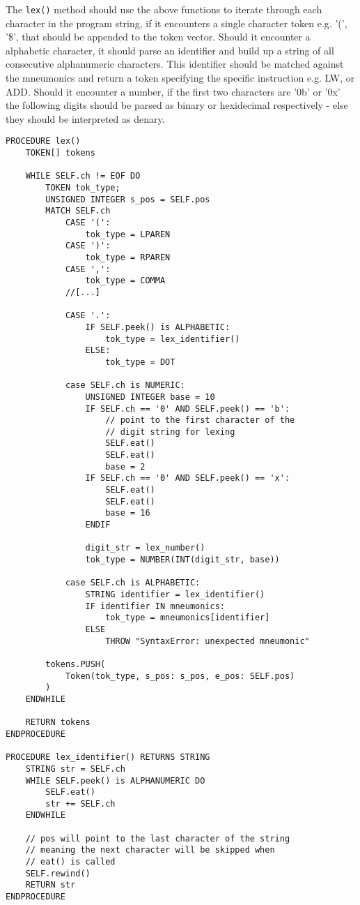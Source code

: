 The \texttt{lex()} method should use the above functions to iterate through each character in the program string, if it encounters a single character token e.g. '(', '\$', that should be appended to the token vector. Should it encounter a alphabetic character, it should parse an identifier and build up a string of all consecutive alphanumeric characters. This identifier should be matched against the mneumonics and return a token specifying the specific instruction e.g. LW, or ADD. Should it encounter a number, if the first two characters are '0b' or '0x' the following digits should be parsed as binary or hexidecimal respectively - else they should be interpreted as denary. 

\begin{lstlisting}
PROCEDURE lex() 
    TOKEN[] tokens

    WHILE SELF.ch != EOF DO 
        TOKEN tok_type;
        UNSIGNED INTEGER s_pos = SELF.pos
        MATCH SELF.ch 
            CASE '(':
                tok_type = LPAREN
            CASE ')':
                tok_type = RPAREN
            CASE ',':
                tok_type = COMMA
            //[...]

            CASE '.':
                IF SELF.peek() is ALPHABETIC:
                    tok_type = lex_identifier()
                ELSE:
                    tok_type = DOT

            case SELF.ch is NUMERIC:
                UNSIGNED INTEGER base = 10
                IF SELF.ch == '0' AND SELF.peek() == 'b':
                    // point to the first character of the
                    // digit string for lexing
                    SELF.eat()
                    SELF.eat()
                    base = 2
                IF SELF.ch == '0' AND SELF.peek() == 'x':
                    SELF.eat()
                    SELF.eat()
                    base = 16
                ENDIF
                
                digit_str = lex_number()
                tok_type = NUMBER(INT(digit_str, base)) 

            case SELF.ch is ALPHABETIC:
                STRING identifier = lex_identifier()
                IF identifier IN mneumonics:
                    tok_type = mneumonics[identifier]
                ELSE 
                    THROW "SyntaxError: unexpected mneumonic"

        tokens.PUSH(
            Token(tok_type, s_pos: s_pos, e_pos: SELF.pos)
        )
    ENDWHILE

    RETURN tokens
ENDPROCEDURE

PROCEDURE lex_identifier() RETURNS STRING
    STRING str = SELF.ch
    WHILE SELF.peek() is ALPHANUMERIC DO 
        SELF.eat()
        str += SELF.ch
    ENDWHILE 

    // pos will point to the last character of the string 
    // meaning the next character will be skipped when 
    // eat() is called 
    SELF.rewind()
    RETURN str
ENDPROCEDURE
\end{lstlisting}

